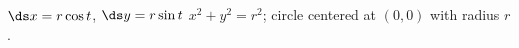 {$\ds x=r\cos t$, \quad $\ds y=r\sin t$
}
{$x^2+y^2=r^2$; circle centered at $(0,0)$ with radius $r$.
}